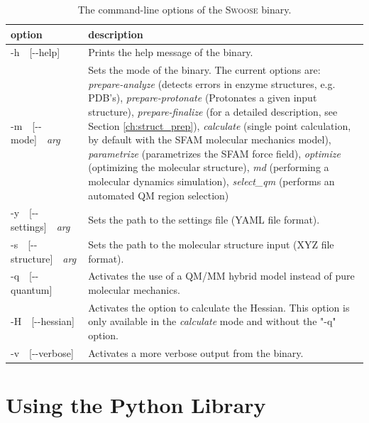 \documentclass[]{tufte-book}
\begin{document}
\begin{table}[h]
\renewcommand{\baselinestretch}{1.3}
\renewcommand{\arraystretch}{1.3}
\caption{\label{tab:command_line_options} \small The command-line options of the
\textsc{Swoose} binary.}
\begin{center}
\begin{tabular}{L{3.3cm} L{6.7cm}}
\hline
\hline
 option & description \\
\hline
-h~~[-{}-help] & Prints the help message of the binary. \\
-m~~[-{}-mode]~~\textit{arg} & Sets the mode of the binary. The current options are: \textit{prepare-analyze} (detects errors in enzyme structures, e.g. PDB's), \textit{prepare-protonate} (Protonates a given input structure), \textit{prepare-finalize} (for a detailed description, see Section \ref{ch:struct_prep}), \textit{calculate} (single point calculation, by default with the SFAM molecular mechanics model),
\textit{parametrize} (parametrizes the SFAM force field), \textit{optimize} (optimizing the molecular structure), \textit{md} (performing a molecular dynamics simulation), \textit{select\_qm} (performs an automated QM region selection)  \\

-y~~[-{}-settings]~~\textit{arg} & Sets the path to the settings file (YAML file format). \\
-s~~[-{}-structure]~~\textit{arg} & Sets the path to the molecular structure input (XYZ file format). \\
-q~~[-{}-quantum] & Activates the use of a QM/MM hybrid model instead of pure molecular mechanics.\\
-H~~[-{}-hessian] & Activates the option to calculate the Hessian. This option is only available in the \textit{calculate} mode and without the "-q" option. \\
-v~~[-{}-verbose] & Activates a more verbose output from the binary. \\
\hline
\hline
\end{tabular}
\renewcommand{\baselinestretch}{1.0}
\renewcommand{\arraystretch}{1.0}
\end{center}
\end{table}


\chapter{Using the Python Library}\label{ch:use_python_library}
\end{document}
